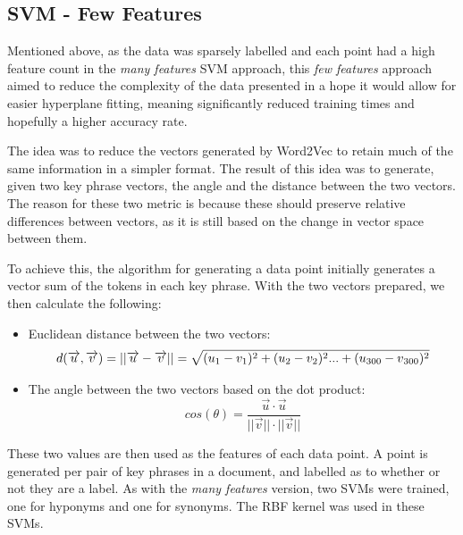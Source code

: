 \subsection{SVM - Few Features}
Mentioned above, as the data was sparsely labelled and each point had a high feature count in the \textit{many features} SVM approach, this \textit{few features} approach aimed to reduce the complexity of the data presented in a hope it would allow for easier hyperplane fitting, meaning significantly reduced training times and hopefully a higher accuracy rate.

The idea was to reduce the vectors generated by Word2Vec to retain much of the same information in a simpler format. The result of this idea was to generate, given two key phrase vectors, the angle and the distance between the two vectors. The reason for these two metric is because these should preserve relative differences between vectors, as it is still based on the change in vector space between them.

To achieve this, the algorithm for generating a data point initially generates a vector sum of the tokens in each key phrase. With the two vectors prepared, we then calculate the following:
\begin{itemize}
	\item Euclidean distance between the two vectors:
	\begin{equation*}
	d(\overrightarrow{u}, \overrightarrow{v}) = ||\overrightarrow{u} - \overrightarrow{v}|| = \sqrt{(u_1 - v_1)^2 + (u_2 - v_2)^2 ... + (u\textsubscript{300} - v\textsubscript{300})^2}
	\end{equation*}
	\item The angle between the two vectors based on the dot product:
	\begin{equation*}
	cos(\theta) = \dfrac{\overrightarrow{u} \cdot \overrightarrow{u}}{||\overrightarrow{v}|| \cdot ||\overrightarrow{v}||}
	\end{equation*}
\end{itemize}

These two values are then used as the features of each data point. A point is generated per pair of key phrases in a document, and labelled as to whether or not they are a label. As with the \textit{many features} version, two SVMs were trained, one for hyponyms and one for synonyms. The RBF kernel was used in these SVMs.

